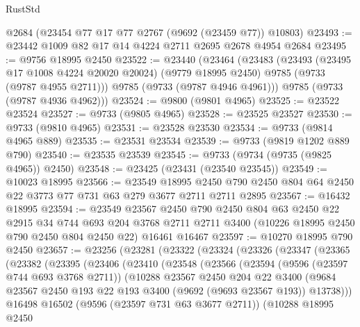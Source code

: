 \begin{lexlean}{RustStd}
\begin{coremodule}
    @2684
    (@23454 @77 @17 @77 @2767 (@9692 (@23459 @77)) @10803)
@23493 := @23442 @1009 @82 @17 @14 @4224 @2711 @2695 @2678 @4954 @2684
@23495 := @9756 @18995 @2450
@23522 := @23440
    (@23464
      (@23483
        (@23493
          (@23495 @17 @1008 @4224 @20020 @20024)
          (@9779 @18995 @2450)
          @9785
          (@9733 (@9787 @4955 @2711)))
        @9785
        (@9733 (@9787 @4946 @4961)))
      @9785
      (@9733 (@9787 @4936 @4962)))
@23524 := @9800 (@9801 @4965)
@23525 := @23522 @23524
@23527 := @9733 (@9805 @4965)
@23528 := @23525 @23527
@23530 := @9733 (@9810 @4965)
@23531 := @23528 @23530
@23534 := @9733 (@9814 @4965 @889)
@23535 := @23531 @23534
@23539 := @9733 (@9819 @1202 @889 @790)
@23540 := @23535 @23539
@23545 := @9733 (@9734 (@9735 (@9825 @4965)) @2450)
@23548 := @23425 (@23431 (@23540 @23545))
@23549 := @10023 @18995
@23566 := @23549
    @18995
    @2450
    @790
    @2450
    @804
    @64
    @2450
    @22
    @3773
    @77
    @731
    @63
    @279
    @3677
    @2711
    @2711
    @2895
@23567 := @16432 @18995
@23594 := @23549
    @23567
    @2450
    @790
    @2450
    @804
    @63
    @2450
    @22
    @2915
    @34
    @744
    @693
    @204
    @3768
    @2711
    @2711
    @3400
    (@10226 @18995 @2450 @790 @2450 @804 @2450 @22)
    @16461
    @16467
@23597 := @10270 @18995 @790 @2450
@23657 := @23256
    (@23281
      (@23322
        (@23324
          (@23326
            (@23347
              (@23365
                (@23382
                  (@23395
                    (@23406
                      (@23410
                        (@23548
                          (@23566
                            (@23594
                              (@9596 (@23597 @744 @693 @3768 @2711))
                              (@10288
                                @23567
                                @2450
                                @204
                                @22
                                @3400
                                (@9684
                                  @23567
                                  @2450
                                  @193
                                  @22
                                  @193
                                  @3400
                                  (@9692 (@9693 @23567 @193))
                                  @13738)))
                            @16498
                            @16502
                            (@9596 (@23597 @731 @63 @3677 @2711))
                            (@10288
                              @18995
                              @2450

\end{coremodule}
\end{lexlean}
